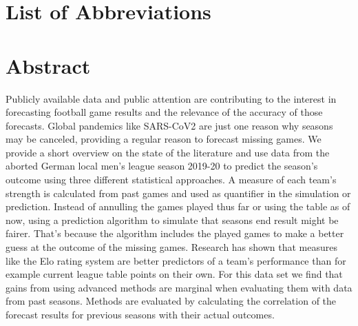 \documentclass[12pt,a4paper]{article}
\begin{document}
\newpage
\listoffigures
{}

\listoftables
{}

\section*{List of Abbreviations}

\begin{adjustwidth}{1.5em}{0pt}

\begin{acronym}[dummyyyy]


\end{acronym}

\end{adjustwidth}

\restoregeometry

\newpage
{}
\hypertarget{abstract}{%
\section{Abstract}\label{abstract}}

Publicly available data and public attention are contributing to the
interest in forecasting football game results and the relevance of the
accuracy of those forecasts. Global pandemics like SARS-CoV2 are just
one reason why seasons may be canceled, providing a regular reason to
forecast missing games. We provide a short overview on the state of the
literature and use data from the aborted German local men's league
season 2019-20 to predict the season's outcome using three different
statistical approaches. A measure of each team's strength is calculated
from past games and used as quantifier in the simulation or prediction.
Instead of annulling the games played thus far or using the table as of
now, using a prediction algorithm to simulate that seasons end result
might be fairer. That's because the algorithm includes the played games
to make a better guess at the outcome of the missing games. Research has
shown that measures like the Elo rating system are better predictors of
a team's performance than for example current league table points on
their own. For this data set we find that gains from using advanced
methods are marginal when evaluating them with data from past seasons.
Methods are evaluated by calculating the correlation of the forecast
results for previous seasons with their actual outcomes.
\end{document}
